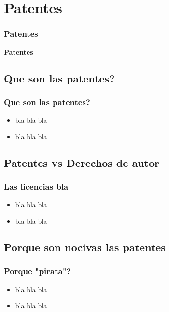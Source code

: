 \section{Patentes}
\frame
{
	\frametitle{Patentes}
	\begin{center}
	\bf \huge Patentes
	\end{center}
}

\subsection{Que son las patentes?}
\frame
{
	\frametitle{Que son las patentes?}
	\begin{itemize}
	\item bla bla bla
	\item bla bla bla
	\end{itemize}
}

\subsection{Patentes vs Derechos de autor}
\frame
{
	\frametitle{Las licencias bla}
	\begin{itemize}
	\item bla bla bla
	\item  bla bla bla
	\end{itemize}
}

\subsection{Porque son nocivas las patentes}
\frame
{
	\frametitle{Porque "pirata"?}
	\begin{itemize}
	\item bla bla bla
	\item bla bla bla
	\end{itemize}
}


